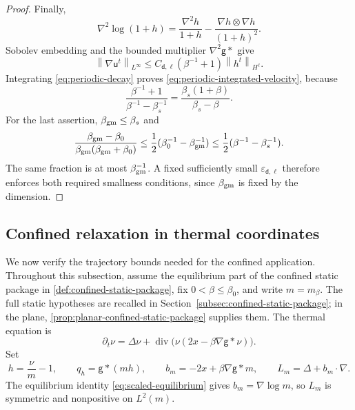 \documentclass[11pt,reqno]{amsart}
\numberwithin{equation}{section}
\theoremstyle{definition}
\theoremstyle{remark}
\newcommand{\g}{\mathsf g}
\renewcommand{\d}{\mathsf d}
\renewcommand{\u}{\mathsf u}
\newcommand{\diver}{\operatorname{div}}
\newcommand{\norm}[1]{\left\lVert#1\right\rVert}
\newcommand{\revision}[1]{{\ifdefined\MarkedRevision\color{red}\fi#1}}
\begin{document}
\begin{proof}
Finally,
\begin{equation}\label{eq:log-hessian}
 \nabla^2\log(1+h)=\frac{\nabla^2 h}{1+h}
                        -\frac{\nabla h\otimes\nabla h}{(1+h)^2}.
\end{equation}
Sobolev embedding and the bounded multiplier $\nabla^2\g*$ give
\begin{equation}\label{eq:velocity-h-bound}
 \norm{\nabla \u^t}_{L^\infty}\leq C_{\d,\ell}(\beta^{-1}+1)
                                           \norm{h^t}_{H^\ell}.
\end{equation}
Integrating \eqref{eq:periodic-decay} proves \eqref{eq:periodic-integrated-velocity}, because
\begin{equation}\label{eq:temperature-cancellation}
 \frac{\beta^{-1}+1}{\beta^{-1}-\beta_s^{-1}}
 =\frac{\beta_s(1+\beta)}{\beta_s-\beta}.
\end{equation}
For the last assertion, $\beta_{\rm gm}\leq\beta_s$ and
\begin{equation}\label{eq:radius-versus-gap}
 \frac{\beta_{\rm gm}-\beta_0}{\beta_{\rm gm}(\beta_{\rm gm}+\beta_0)}
 \leq \frac12(\beta_0^{-1}-\beta_{\rm gm}^{-1})
 \leq \frac12(\beta^{-1}-\beta_s^{-1}).
\end{equation}
The same fraction is at most $\beta_{\rm gm}^{-1}$. A fixed sufficiently small $\varepsilon_{\d,\ell}$ therefore enforces both required smallness conditions, since $\beta_{\rm gm}$ is fixed by the dimension.
\end{proof}


\begingroup\ifdefined\MarkedRevision\color{red}\fi
\subsection{Confined relaxation in thermal coordinates}

We now verify the trajectory bounds needed for the confined application. Throughout this subsection, assume the equilibrium part of the confined static package in \cref{def:confined-static-package}, fix $0<\beta\leq\beta_0$, and write $m=m_\beta$. \revision{The full static hypotheses are recalled in Section~\ref{subsec:confined-static-package}; in the plane, \cref{prop:planar-confined-static-package} supplies them.} The thermal equation is
\begin{equation}\label{eq:confined-thermal-equation}
 \partial_t\nu=\Delta\nu+\diver\bigl(\nu(2x-\beta\nabla\g*\nu)\bigr).
\end{equation}
Set
\begin{equation}\label{eq:confined-ratio-notation}
 h=\frac\nu m-1,\qquad q_h=\g*(mh),\qquad
 b_m=-2x+\beta\nabla\g*m,
 \qquad L_m=\Delta+b_m\cdot\nabla.
\end{equation}
The equilibrium identity \eqref{eq:scaled-equilibrium} gives $b_m=\nabla\log m$, so $L_m$ is symmetric and nonpositive on $L^2(m)$.
\end{document}

